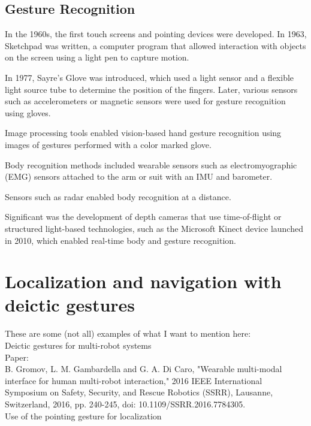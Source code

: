 \subsection{Gesture Recognition}
In the 1960s, the first touch screens and pointing devices were developed. In 1963, Sketchpad was written, a computer program that allowed interaction with objects on the screen using a light pen to capture motion.\par
In 1977, Sayre's Glove was introduced, which used a light sensor and a flexible light source tube to determine the position of the fingers. Later, various sensors such as accelerometers or magnetic sensors were used for gesture recognition using gloves.\par
Image processing tools enabled vision-based hand gesture recognition using images of gestures performed with a color marked glove.\par
Body recognition methods included wearable sensors such as electromyographic (EMG) sensors attached to the arm or suit with an IMU and barometer.\par
Sensors such as radar enabled body recognition at a distance.\par

Significant was the development of depth cameras that use time-of-flight or structured light-based technologies, such as the Microsoft Kinect device launched in 2010, which enabled real-time body and gesture recognition.\par

\section{Localization and navigation with deictic gestures}

These are some (not all) examples of what I want to mention here:\\
 
Deictic gestures for multi-robot systems \\

Paper: \\
B. Gromov, L. M. Gambardella and G. A. Di Caro, "Wearable multi-modal interface for human multi-robot interaction," 2016 IEEE International Symposium on Safety, Security, and Rescue Robotics (SSRR), Lausanne, Switzerland, 2016, pp. 240-245, doi: 10.1109/SSRR.2016.7784305.\\

Use of the pointing gesture for localization \\

